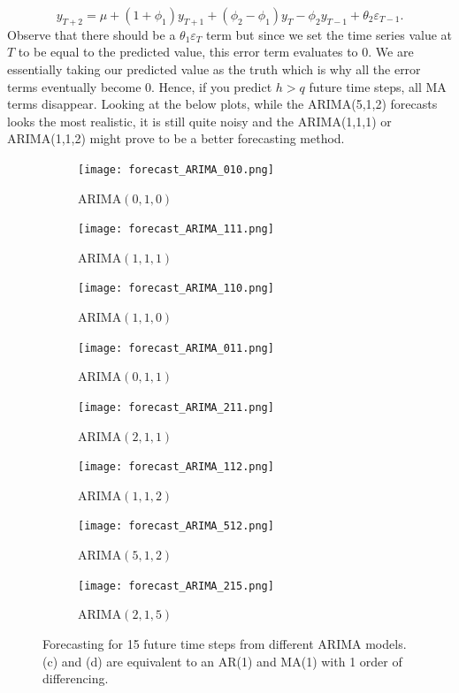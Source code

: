 \documentclass{article}
\begin{document}
  \begin{equation*}
    y_{T+2} = \mu + (1 + \phi_1)y_{T+1} + (\phi_2 - \phi_1)y_{T} - \phi_2y_{T-1} + \theta_2\varepsilon_{T-1}.
  \end{equation*}
  Observe that there should be a $\theta_1\varepsilon_{T}$ term but since we set the time series value at $T$ to be equal to the predicted value, this error term evaluates to 0. We are essentially taking our predicted value as the truth which is why all the error terms eventually become 0. Hence, if you predict $h > q$ future time steps, all MA terms disappear. Looking at the below plots, while the ARIMA(5,1,2) forecasts looks the most realistic, it is still quite noisy and the ARIMA(1,1,1) or ARIMA(1,1,2) might prove to be a better forecasting method.

  \begin{figure}[H]
    \centering
    \captionsetup{justification=centering}
    \begin{subfigure}[b]{0.49\linewidth}
      \texttt{[image: forecast\_ARIMA\_010.png]}
      \caption{ARIMA$(0, 1, 0)$}
    \end{subfigure}
    \begin{subfigure}[b]{0.49\linewidth}
      \texttt{[image: forecast\_ARIMA\_111.png]}
      \caption{ARIMA$(1, 1, 1)$}
    \end{subfigure}
    \begin{subfigure}[b]{0.49\linewidth}
      \texttt{[image: forecast\_ARIMA\_110.png]}
      \caption{ARIMA$(1, 1, 0)$}
    \end{subfigure}
    \begin{subfigure}[b]{0.49\linewidth}
      \texttt{[image: forecast\_ARIMA\_011.png]}
      \caption{ARIMA$(0, 1, 1)$}
    \end{subfigure}
    \begin{subfigure}[b]{0.49\linewidth}
      \texttt{[image: forecast\_ARIMA\_211.png]}
      \caption{ARIMA$(2, 1, 1)$}
    \end{subfigure}
    \begin{subfigure}[b]{0.49\linewidth}
      \texttt{[image: forecast\_ARIMA\_112.png]}
      \caption{ARIMA$(1, 1, 2)$}
    \end{subfigure}
    \begin{subfigure}[b]{0.49\linewidth}
      \texttt{[image: forecast\_ARIMA\_512.png]}
      \caption{ARIMA$(5, 1, 2)$}
    \end{subfigure}
    \begin{subfigure}[b]{0.49\linewidth}
      \texttt{[image: forecast\_ARIMA\_215.png]}
      \caption{ARIMA$(2, 1, 5)$}
    \end{subfigure}
    \caption{Forecasting for 15 future time steps from different ARIMA models. (c) and (d) are equivalent to an AR(1) and MA(1) with 1 order of differencing.}
  \end{figure}
  
\end{document}
